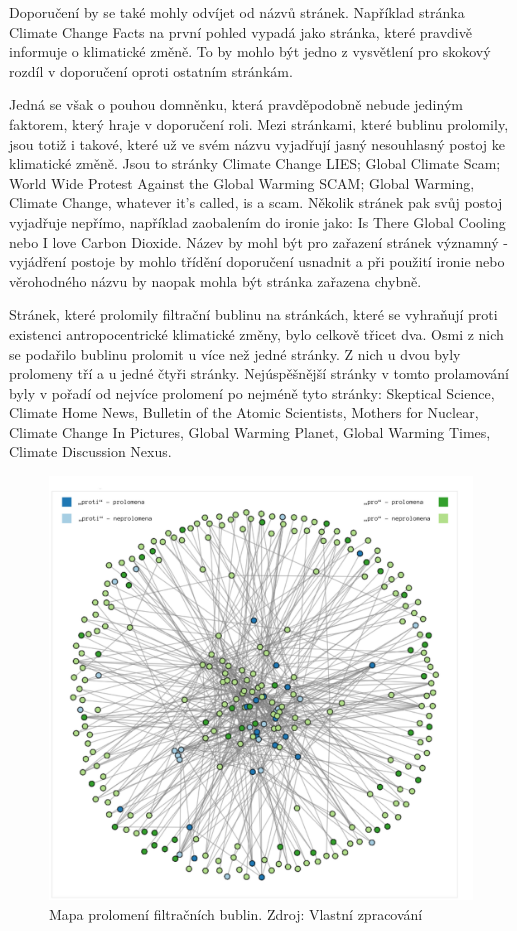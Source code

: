     Doporučení by se také mohly odvíjet od názvů stránek. Například stránka Climate Change Facts na první pohled vypadá jako stránka, které pravdivě informuje o klimatické změně. To by mohlo být jedno z vysvětlení pro skokový rozdíl v doporučení oproti ostatním stránkám.
    
    Jedná se však o pouhou domněnku, která pravděpodobně nebude jediným faktorem, který hraje v doporučení roli. Mezi stránkami, které bublinu prolomily, jsou totiž i takové, které už ve svém názvu vyjadřují jasný nesouhlasný postoj ke klimatické změně. Jsou to stránky Climate Change LIES; Global Climate Scam; World Wide Protest Against the Global Warming SCAM; Global Warming, Climate Change, whatever it's called, is a scam. Několik stránek pak svůj postoj vyjadřuje nepřímo, například zaobalením do ironie jako: Is There Global Cooling nebo I love Carbon Dioxide. Název by mohl být pro zařazení stránek významný - vyjádření postoje by mohlo třídění doporučení usnadnit a při použití ironie nebo věrohodného názvu by naopak mohla být stránka zařazena chybně. 

    
    Stránek, které prolomily filtrační bublinu na stránkách, které se vyhraňují proti existenci antropocentrické klimatické změny, bylo celkově třicet dva. Osmi z nich se podařilo bublinu prolomit u více než jedné stránky. Z nich u dvou byly prolomeny tří a u jedné čtyři stránky. Nejúspěšnější stránky v tomto prolamování byly v pořadí od nejvíce prolomení po nejméně tyto stránky: Skeptical Science, Climate Home News, Bulletin of the Atomic Scientists, Mothers for Nuclear, Climate Change In Pictures, Global Warming Planet, Global Warming Times, Climate Discussion Nexus.
    
    \begin{figure}[H]
        \includegraphics[width=13cm]{obrazky/prolomenibublinymapa_spopisky.png}
        \centering
        \caption[Mapa prolomení filtračních bublin]{Mapa prolomení filtračních bublin. Zdroj: Vlastní zpracování}
        \label{fig:fb-klima-stranky-bubliny}
    \end{figure}
    


